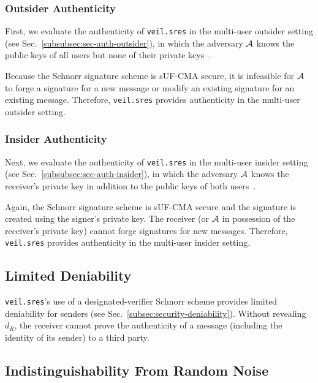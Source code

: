 \subsubsection{Outsider Authenticity}

First, we evaluate the authenticity of \texttt{veil.sres} in the multi-user outsider setting
(see Sec.~\ref{subsubsec:sec-auth-outsider}), in which the adversary $\mathcal{A}$ knows the public keys of all users but
none of their private keys~\cite[p. 47]{baek2010}.

Because the Schnorr signature scheme is sUF-CMA secure, it is infeasible for $\mathcal{A}$ to forge a signature for a new
message or modify an existing signature for an existing message.
Therefore, \texttt{veil.sres} provides authenticity in the multi-user outsider setting.

\subsubsection{Insider Authenticity}

Next, we evaluate the authenticity of \texttt{veil.sres} in the multi-user insider setting
(see Sec.~\ref{subsubsec:sec-auth-insider}), in which the adversary $\mathcal{A}$ knows the receiver's private key in
addition to the public keys of both users~\cite[p. 48]{baek2010}.

Again, the Schnorr signature scheme is sUF-CMA secure and the signature is created using the signer's private key.
The receiver (or $\mathcal{A}$ in possession of the receiver's private key) cannot forge signatures for new messages.
Therefore, \texttt{veil.sres} provides authenticity in the multi-user insider setting.

\subsection{Limited Deniability}\label{subsec:veil.sres-deniability}

\texttt{veil.sres}'s use of a designated-verifier Schnorr scheme provides limited deniability for senders
(see Sec.~\ref{subsec:security-deniability}).
Without revealing $d_R$, the receiver cannot prove the authenticity of a message (including the identity of its sender)
to a third party.

\subsection{Indistinguishability From Random Noise}\label{subsec:veil.sres-indistinguishability}

